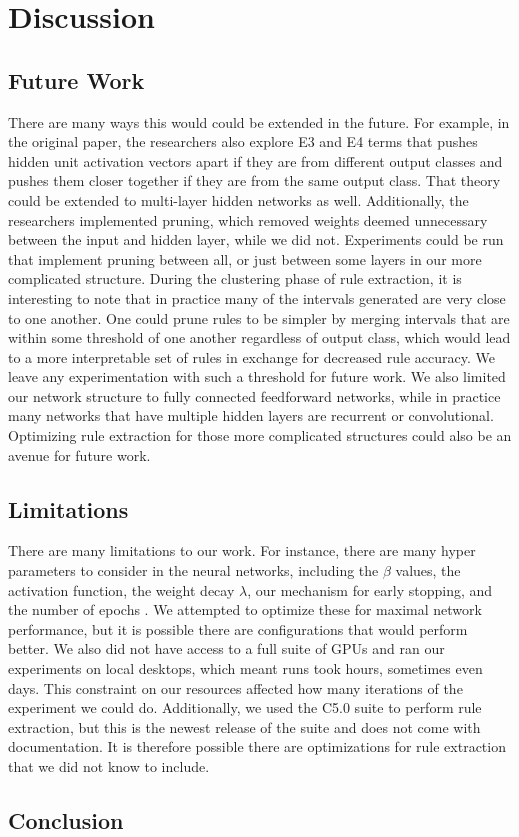 \section{Discussion}
\label{sec:discussion}

\subsection{Future Work}
\label{sec:futurework}
There are many ways this would could be extended in the future. For
example, in the original paper, the researchers also explore E3 and E4
terms that pushes hidden unit activation vectors apart if they are from different
output classes and pushes them closer together if they are from the
same output class. That theory could be extended to multi-layer hidden
networks as well. Additionally, the researchers implemented pruning,
which removed weights deemed unnecessary between the input and hidden
layer, while we did not. Experiments could be run that implement
pruning between all, or just between some layers in our more
complicated structure. During the clustering phase of rule extraction, it
is interesting to note that in practice many of the intervals generated are very close
to one another. One could prune rules to be simpler by merging
intervals that are within some threshold of one another regardless of
output class, which would lead to a more interpretable set of rules in exchange for decreased
rule accuracy. We leave any experimentation with such a threshold for
future work. We also limited our network structure to fully
connected feedforward networks, while in practice many networks that
have multiple hidden layers are recurrent or convolutional. Optimizing
rule extraction for those more complicated structures could also be an
avenue for future work. 

\subsection{Limitations}
\label{sec:limitations}
There are many limitations to our work. For instance, there are many
hyper parameters to consider in the neural networks, including the
$\beta$ values, the activation function, the weight decay $\lambda$,
our mechanism for early stopping, and the number of epochs
. We attempted to optimize these for maximal network
performance, but it is possible there are configurations that would
perform better. We also did not have access to a full suite of GPUs
and ran our experiments on local desktops, which meant runs took
hours, sometimes even days. This constraint on our resources affected
how many iterations of the experiment we could do. Additionally, we
used the C5.0 suite to perform rule extraction, but this is the newest
release of the suite and does not come with documentation. It is
therefore possible there are optimizations for rule extraction that we
did not know to include.

\subsection{Conclusion}
\label{sec:conclusion}

